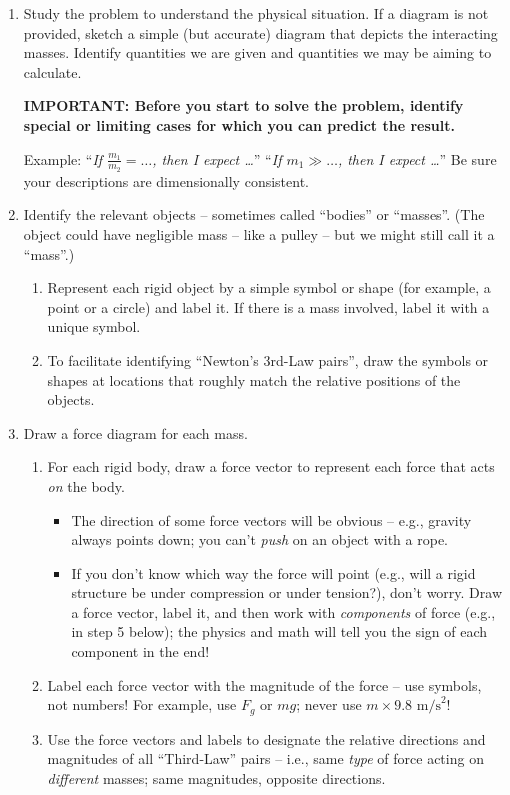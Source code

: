 \documentclass[11pt, letterpaper, openany]{book}
\begin{document}
\begin{enumerate}
    \item Study the problem to understand the physical situation. If a diagram is not provided, sketch a simple (but accurate) diagram that depicts the interacting masses. Identify quantities we are given and quantities we may be aiming to calculate.
    
    \textbf{IMPORTANT: Before you start to solve the problem, identify special or limiting cases for which you can predict the result.}
    
    Example: ``\textit{If $\frac{m_1}{m_2} = \dots$, then I expect \dots}'' ``\textit{If $m_1 \gg \dots$, then I expect \dots}'' Be sure your descriptions are dimensionally consistent.
    
    \item Identify the relevant objects -- sometimes called ``bodies'' or ``masses''. (The object could have negligible mass -- like a pulley -- but we might still call it a ``mass''.)
    \begin{enumerate}[label=\alph*.]
        \item Represent each rigid object by a simple symbol or shape (for example, a point or a circle) and label it. If there is a mass involved, label it with a unique symbol.
        \item To facilitate identifying ``Newton's 3rd-Law pairs'', draw the symbols or shapes at locations that roughly match the relative positions of the objects.
    \end{enumerate}
    
    \item Draw a force diagram for each mass.
    \begin{enumerate}[label=\alph*.]
        \item For each rigid body, draw a force vector to represent each force that acts \textit{on} the body.
        \begin{itemize}
            \item The direction of some force vectors will be obvious -- e.g., gravity always points down; you can't \textit{push} on an object with a rope.
            \item If you don't know which way the force will point (e.g., will a rigid structure be under compression or under tension?), don't worry. Draw a force vector, label it, and then work with \textit{components} of force (e.g., in step 5 below); the physics and math will tell you the sign of each component in the end!
        \end{itemize}
        \item Label each force vector with the magnitude of the force -- use symbols, not numbers! For example, use $F_g$ or $mg$; never use $m \times 9.8\text{ m/s}^2$!
        \item Use the force vectors and labels to designate the relative directions and magnitudes of all ``Third-Law'' pairs -- i.e., same \textit{type} of force acting on \textit{different} masses; same magnitudes, opposite directions.
    \end{enumerate}
    

\end{enumerate}
\end{document}
